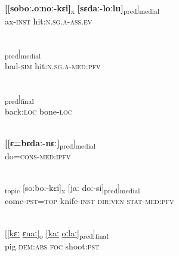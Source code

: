 \documentclass[output=paper]{LSP/langsci}
\begin{document}
\begin{exe}
\ex \label{Aiex:App38}
\gll \textbf{[[soboː.oːnoː-kɛi]}\textsubscript{x}	\textbf{[sɛdaː-loːlu]}\textsubscript{pred}]\textsubscript{medial}\\
ax-\textsc{inst}	hit:\textsc{n.sg.a}-\textsc{ass.ev}\\
\glt {}\\
\end{exe}

\begin{exe}
\ex \label{Aiex:App39}
\gll \underline{\smash{[[moɡaːɡɛ-li}}	\underline{\smash{sɛdɛ-si]}}\textsubscript{pred}]\textsubscript{medial}\\
bad-\textsc{sim}	hit:\textsc{n.sg.a}-\textsc{med}:\textsc{pfv}\\
\glt {}\\
\end{exe}

\begin{exe}
\ex \label{Aiex:App40}
\gll [[ɸoːsɛː	kiː-jɛː]\textsubscript{pred}]\textsubscript{final}\\
back:\textsc{loc}	bone-\textsc{loc}\\
\glt {}\\
\end{exe}

\begin{exe}
\ex \label{Aiex:App41}
\gll \textbf{[[ɛ=bɛdaː-nɛː]}\textsubscript{pred}]\textsubscript{medial}\\
do=\textsc{cons}-\textsc{med}:\textsc{ipfv}\\
\glt {}\\
\end{exe}

\begin{exe}
\ex \label{Aiex:App42}
\gll [[mi-jɛː=jaː]\textsubscript{topic}	[soːboː-kɛi]\textsubscript{x}	[jaː	doː-si]\textsubscript{pred}]\textsubscript{medial}\\
come-\textsc{pst}=\textsc{top}	knife-\textsc{inst}	\textsc{dir:ven}	\textsc{stat}-\textsc{med}:\textsc{pfv}\\
\glt {}\\
\end{exe}

\begin{exe}
\ex \label{Aiex:App43}
\gll \underline{[[kɛː}	\underline{ɛnaː]\textsubscript{o}}	\underline{[kaː}	\underline{oːlaː]}\textsubscript{pred}]\textsubscript{final}\\
pig	\textsc{dem}:\textsc{abs}	\textsc{foc}	shoot:\textsc{pst}\\
\glt {}\\
\end{exe}
\end{document}
